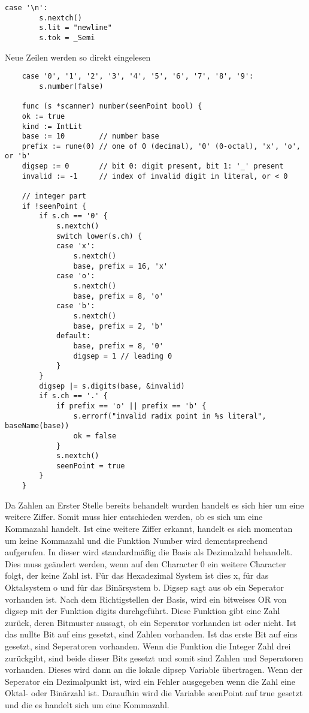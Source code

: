 \begin{lstlisting}
case '\n':
		s.nextch()
		s.lit = "newline"
		s.tok = _Semi
\end{lstlisting}
Neue Zeilen werden so direkt eingelesen
\begin{lstlisting}
	case '0', '1', '2', '3', '4', '5', '6', '7', '8', '9':
		s.number(false)
        
    func (s *scanner) number(seenPoint bool) {
	ok := true
	kind := IntLit
	base := 10        // number base
	prefix := rune(0) // one of 0 (decimal), '0' (0-octal), 'x', 'o', or 'b'
	digsep := 0       // bit 0: digit present, bit 1: '_' present
	invalid := -1     // index of invalid digit in literal, or < 0

	// integer part
	if !seenPoint {
		if s.ch == '0' {
			s.nextch()
			switch lower(s.ch) {
			case 'x':
				s.nextch()
				base, prefix = 16, 'x'
			case 'o':
				s.nextch()
				base, prefix = 8, 'o'
			case 'b':
				s.nextch()
				base, prefix = 2, 'b'
			default:
				base, prefix = 8, '0'
				digsep = 1 // leading 0
			}
		}
		digsep |= s.digits(base, &invalid)
		if s.ch == '.' {
			if prefix == 'o' || prefix == 'b' {
				s.errorf("invalid radix point in %s literal", baseName(base))
				ok = false
			}
			s.nextch()
			seenPoint = true
		}
	}
\end{lstlisting}
Da Zahlen an Erster Stelle bereits behandelt wurden handelt es sich hier um eine weitere Ziffer. Somit muss hier entschieden werden, ob es sich um eine Kommazahl handelt. Ist eine weitere Ziffer erkannt, handelt es sich momentan um keine Kommazahl und die Funktion Number wird dementsprechend aufgerufen. In dieser wird standardmäßig die Basis als Dezimalzahl behandelt. Dies muss geändert werden, wenn auf den Character 0 ein weitere Character folgt, der keine Zahl ist. Für das Hexadezimal System ist dies x, für das Oktalsystem o und für das Binärsystem b. Digsep sagt aus ob ein Seperator vorhanden ist. 
Nach dem Richtigstellen der Basis, wird ein bitweises OR von digsep mit der Funktion digits durchgeführt. Diese Funktion gibt eine Zahl zurück, deren Bitmuster aussagt, ob ein Seperator vorhanden ist oder nicht. Ist das nullte Bit auf eins gesetzt, sind Zahlen vorhanden. Ist das erste Bit auf eins gesetzt, sind Seperatoren vorhanden. Wenn die Funktion die Integer Zahl drei zurückgibt, sind beide dieser Bits gesetzt und somit sind Zahlen und Seperatoren vorhanden. Dieses wird dann an die lokale dipsep Variable übertragen. Wenn der Seperator ein Dezimalpunkt ist, wird ein Fehler ausgegeben wenn die Zahl eine Oktal- oder Binärzahl ist. Daraufhin wird die Variable seenPoint auf true gesetzt und die es handelt sich um eine Kommazahl.
